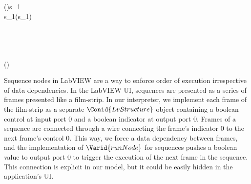 \begin{hscode}\SaveRestoreHook
{}%
%
%
%
%
%
\>[B]{}\;(\;\;)\;s_{1}\;\;\mathrel{=}{}\<[E]%
\\
\>[B]{}\<[4]%
\>[4]{}\;\;\;s_{1}\;\;(\;s_{1}\;\;){}\<[E]%
\\
\>[B]{}\<[4]%
\>[4]{}\<[E]%
\\
\>[4]{}\<[7]%
\>[7]{}\;\mathrel{=}{}\<[E]%
\\
\>[7]{}\<[10]%
\>[10]{}\neg \;\<[E]%
\\
\>[7]{}\<[10]%
\>[10]{}\<[E]%
\\
\>[10]{}\<[13]%
\>[13]{}\;\mathrel{=}\;(\;)\;\<[E]%
\ColumnHook
\end{hscode}\resethooks

Sequence nodes in LabVIEW are a way to enforce order of execution irrespective
of data dependencies. In the LabVIEW UI, sequences are presented as a series
of frames presented like a film-strip. In our interpreter, we implement each
frame of the film-strip as a separate \ensuremath{\Conid{LvStructure}} object containing a
boolean control at input port 0 and a boolean indicator at output port 0.
Frames of a sequence are connected through a wire connecting the frame's
indicator 0 to the next frame's control 0. This way, we force a
data dependency between frames, and the implementation of \ensuremath{\Varid{runNode}} for
sequences pushes a boolean value to output port 0 to trigger the execution of
the next frame in the sequence. This connection is explicit in our model,
but it could be easily hidden in the application's UI.

